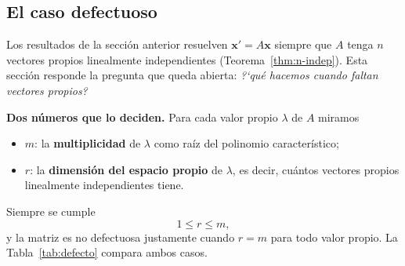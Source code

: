 
\makeatletter
\ifdefined\bbereffixdone\else
  \def\bbereffixdone{}
\fi
\makeatother


\subsection{El caso defectuoso}

Los resultados de la secci\'on anterior resuelven $\mathbf{x}'=A\mathbf{x}$ siempre que $A$ tenga $n$ vectores propios linealmente independientes (Teorema~\ref{thm:n-indep}). Esta secci\'on responde la pregunta que queda abierta: \emph{?`qu\'e hacemos cuando faltan vectores propios?}

\textbf{Dos n\'umeros que lo deciden.} Para cada valor propio $\lambda$ de $A$ miramos

\begin{itemize}
    \item $m$: la \textbf{multiplicidad} de $\lambda$ como ra\'iz del polinomio caracter\'istico;
    \item $r$: la \textbf{dimensi\'on del espacio propio} de $\lambda$, es decir, cu\'antos vectores propios linealmente independientes tiene.
\end{itemize}
Siempre se cumple
\[
1\le r\le m,
\]
y la matriz es no defectuosa justamente cuando $r=m$ para todo valor propio. La Tabla~\ref{tab:defecto} compara ambos casos.


